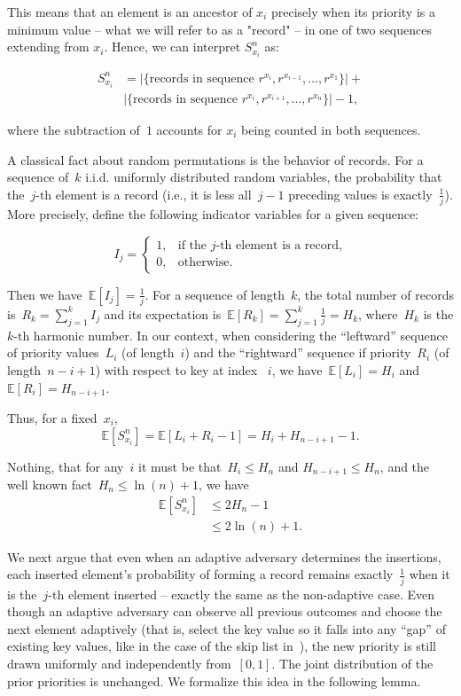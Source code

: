 This means that an element is an ancestor of $x_i$ precisely when its priority is a minimum value -- what we will refer to as a "record" -- in one of two sequences extending from $x_i$. Hence, we can interpret $S^n_{x_i}$ as:

\begin{align*}
S^n_{x_i} &= |\{\text{records in sequence } r^{x_i},r^{x_{i-1}},\ldots,r^{x_1}\}| + \\&|\{\text{records in sequence } r^{x_i},r^{x_{i+1}},\ldots,r^{x_n}\}| - 1,
\end{align*}

where the subtraction of~$1$ accounts for $x_i$ being counted in both sequences. 

A classical fact about random permutations is the behavior of records. For a sequence of~$k$ i.i.d. uniformly distributed random variables, the probability that the~$j\text{-th}$ element is a record (i.e., it is less all~$j-1$ preceding values is exactly~$\frac{1}{j}$). More precisely, define the following indicator variables for a given sequence:

$$ I_j = 
\begin{cases}
    1, & \text{if the } j\text{-th} \text{ element is a record,}\\
    0, & \text{otherwise.}
\end{cases}
$$

Then we have~$\mathbb{E}[I_j] = \frac{1}{j}$. For a sequence of length~$k$, the total number of records is~$R_k = \sum_{j=1}^{k} I_j$ and its expectation is~$\mathbb{E}[R_k] = \sum_{j=1}^{k} \frac{1}{j} = H_k$, where~$H_k$ is the $k\text{-th}$ harmonic number. In our context, when considering the ``leftward'' sequence of priority values~$L_i$ (of length~$i$) and the ``rightward'' sequence if priority~$R_i$ (of length~$n-i+1$) with respect to key at index ~$i$, we have~$\mathbb{E}[L_i] = H_i$ and~$\mathbb{E}[R_i] = H_{n-i+1}$. 

Thus, for a fixed~$x_i$,
$$\mathbb{E}[S^{n}_{x_i}] = \mathbb{E}[L_i + R_i - 1] = H_i + H_{n-i+1} - 1.$$

Nothing, that for any~$i$ it must be that~$ H_i \leq H_n$ and $H_{n-i+1} \leq H_n$, and the well known fact~$H_n \leq \ln(n) + 1$, we have
\begin{align*}
    \mathbb{E}[S^{n}_{x_i}] &\leq 2H_n - 1 \\
    &\leq 2\ln(n) + 1.
\end{align*}

We next argue that even when an adaptive adversary determines the insertions, each inserted element's probability of forming a record remains exactly~$\frac{1}{j}$ when it is the~$j\text{-th}$ element inserted -- exactly the same as the non-adaptive case. Even though an adaptive adversary can observe all previous outcomes and choose the next element adaptively (that is, select the key value so it falls into any ``gap'' of existing key values, like in the case of the skip list in~), the new priority is still drawn uniformly and independently from~$[0,1]$. The joint distribution of the prior priorities is unchanged. We formalize this idea in the following lemma. 

